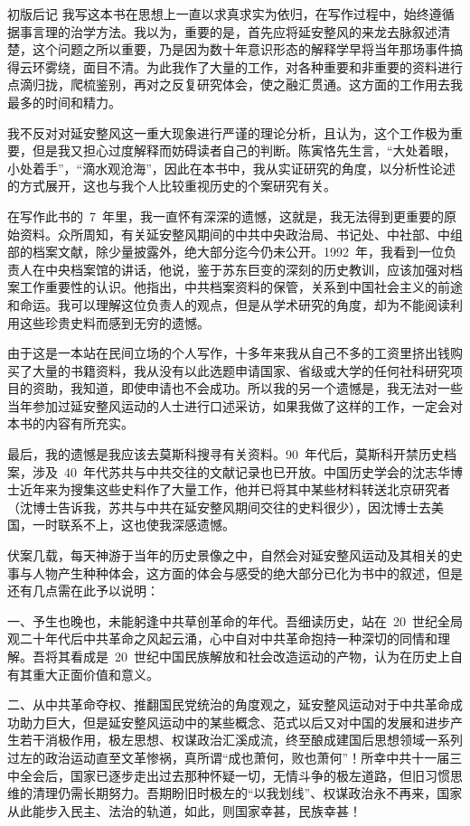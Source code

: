 \begin{pre-post-text}{初版后记}
我写这本书在思想上一直以求真求实为依归，在写作过程中，始终遵循据事言理的治学方法。我以为，重要的是，首先应将延安整风的来龙去脉叙述清楚，这个问题之所以重要，乃是因为数十年意识形态的解释学早将当年那场事件搞得云环雾绕，面目不清。为此我作了大量的工作，对各种重要和非重要的资料进行点滴归拢，爬梳鉴别，再对之反复研究体会，使之融汇贯通。这方面的工作用去我最多的时间和精力。

我不反对对延安整风这一重大现象进行严谨的理论分析，且认为，这个工作极为重要，但是我又担心过度解释而妨碍读者自己的判断。陈寅恪先生言，“大处着眼，小处着手”，“滴水观沧海”，因此在本书中，我从实证研究的角度，以分析性论述的方式展开，这也与我个人比较重视历史的个案研究有关。

在写作此书的~7~年里，我一直怀有深深的遗憾，这就是，我无法得到更重要的原始资料。众所周知，有关延安整风期间的中共中央政治局、书记处、中社部、中组部的档案文献，除少量披露外，绝大部分迄今仍未公开。1992~年，我看到一位负责人在中央档案馆的讲话，他说，鉴于苏东巨变的深刻的历史教训，应该加强对档案工作重要性的认识。他指出，中共档案资料的保管，关系到中国社会主义的前途和命运。我可以理解这位负责人的观点，但是从学术研究的角度，却为不能阅读利用这些珍贵史料而感到无穷的遗憾。

由于这是一本站在民间立场的个人写作，十多年来我从自己不多的工资里挤出钱购买了大量的书籍资料，我从没有以此选题申请国家、省级或大学的任何社科研究项目的资助，我知道，即使申请也不会成功。所以我的另一个遗憾是，我无法对一些当年参加过延安整风运动的人士进行口述采访，如果我做了这样的工作，一定会对本书的内容有所充实。

最后，我的遗憾是我应该去莫斯科搜寻有关资料。90~年代后，莫斯科开禁历史档案，涉及~40~年代苏共与中共交往的文献记录也已开放。中国历史学会的沈志华博士近年来为搜集这些史料作了大量工作，他并已将其中某些材料转送北京研究者（沈博士告诉我，苏共与中共在延安整风期间交往的史料很少），因沈博士去美国，一时联系不上，这也使我深感遗憾。

伏案几载，每天神游于当年的历史景像之中，自然会对延安整风运动及其相关的史事与人物产生种种体会，这方面的体会与感受的绝大部分已化为书中的叙述，但是还有几点需在此予以说明：

一、予生也晚也，未能躬逢中共草创革命的年代。吾细读历史，站在~20~世纪全局观二十年代后中共革命之风起云涌，心中自对中共革命抱持一种深切的同情和理解。吾将其看成是~20~世纪中国民族解放和社会改造运动的产物，认为在历史上自有其重大正面价值和意义。

二、从中共革命夺权、推翻国民党统治的角度观之，延安整风运动对于中共革命成功助力巨大，但是延安整风运动中的某些概念、范式以后又对中国的发展和进步产生若干消极作用，极左思想、权谋政治汇溪成流，终至酿成建国后思想领域一系列过左的政治运动直至文革惨祸，真所谓“成也萧何，败也萧何”！所幸中共十一届三中全会后，国家已逐步走出过去那种怀疑一切，无情斗争的极左道路，但旧习惯思维的清理仍需长期努力。吾期盼旧时极左的“以我划线”、权谋政治永不再来，国家从此能步入民主、法治的轨道，如此，则国家幸甚，民族幸甚！


\end{pre-post-text}
